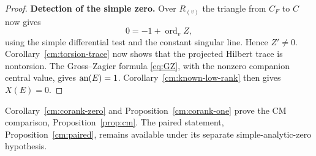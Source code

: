 \begin{proof}
\par\smallskip\noindent\textbf{Detection of the simple zero.}\enspace
Over \(R_{(v)}\) the triangle from \(C_F\) to \(C\) now gives
\begin{equation}\label{cm:eq:center-order}
0=-1+\operatorname{ord}_{v} Z,
\end{equation}
using the simple differential test and the constant singular line. Hence \(Z'\ne0\).
Corollary~\ref{cm:torsion-trace} now shows that the projected
Hilbert trace is nontorsion. The Gross--Zagier formula
\eqref{eq:GZ}, with the nonzero companion central value, gives
\(\operatorname{an}(E)=1\). Corollary~\ref{cm:known-low-rank} then gives
\(X(E)=0\).
\end{proof}

Corollary~\ref{cm:corank-zero} and Proposition~\ref{cm:corank-one}
prove the CM comparison, Proposition~\ref{prop:cm}.
The paired statement, Proposition~\ref{cm:paired}, remains available
under its separate simple-analytic-zero hypothesis.
